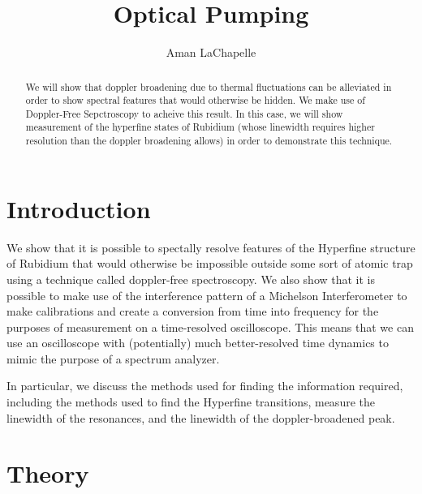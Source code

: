 \documentclass{article}
\title{Optical Pumping}
\author{Aman LaChapelle}
\begin{document}
\raggedright
\maketitle

\begin{abstract}
  We will show that doppler broadening due to thermal fluctuations can be alleviated in order to show spectral features that would otherwise be hidden.  We make use of Doppler-Free Sepctroscopy to acheive this result.  In this case, we will show measurement of the hyperfine states of Rubidium (whose linewidth requires higher resolution than the doppler broadening allows) in order to demonstrate this technique.
\end{abstract}

\tableofcontents
\newpage

\section{Introduction}
  We show that it is possible to spectally resolve features of the Hyperfine structure of Rubidium that would otherwise be impossible outside some sort of atomic trap using a technique called doppler-free spectroscopy.  We also show that it is possible to make use of the interference pattern of a Michelson Interferometer to make calibrations and create a conversion from time into frequency for the purposes of measurement on a time-resolved oscilloscope.  This means that we can use an oscilloscope with (potentially) much better-resolved time dynamics to mimic the purpose of a spectrum analyzer.

  \hspace{.25cm}

  In particular, we discuss the methods used for finding the information required, including the methods used to find the Hyperfine transitions, measure the linewidth of the resonances, and the linewidth of the doppler-broadened peak.

\section{Theory}
\end{document}
